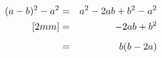 \LARGE
\begin{eqnarray}
  (a-b)^2-a^2&=&a^2-2ab+b^2-a^2 \notag \\ [2mm]
&=&-2ab+b^2  \notag \\[2mm]
&=&b(b-2a)
\end{eqnarray}